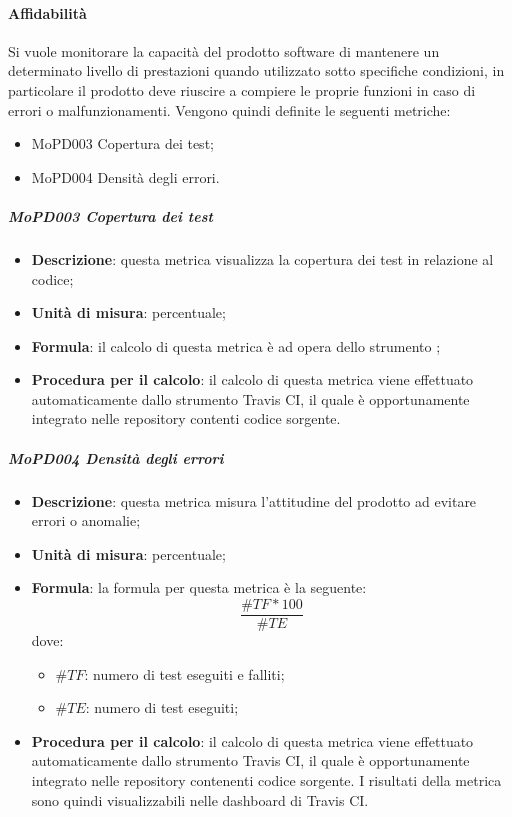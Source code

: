 \documentclass[../norme-di-progetto.tex]{subfiles}
\begin{document}
\paragraph{Affidabilità}
Si vuole monitorare la capacità del prodotto software di mantenere un determinato livello di prestazioni quando utilizzato sotto specifiche condizioni, in particolare il prodotto deve riuscire a compiere le proprie funzioni in caso di errori o malfunzionamenti. Vengono quindi definite le seguenti metriche:
\begin{itemize}
  \item MoPD003 Copertura dei test;
  \item MoPD004 Densità degli errori.
\end{itemize}
\subparagraph{MoPD003 Copertura dei test}
\begin{itemize}
  \item \textbf{Descrizione}: questa metrica visualizza la copertura dei test in relazione al codice;
  \item \textbf{Unità di misura}: percentuale;
  \item \textbf{Formula}: il calcolo di questa metrica è ad opera dello strumento ;
  \item \textbf{Procedura per il calcolo}: il calcolo di questa metrica viene effettuato automaticamente dallo strumento Travis CI, il quale è opportunamente integrato nelle repository contenti codice sorgente.
\end{itemize}

\subparagraph{MoPD004 Densità degli errori}
\begin{itemize}
  \item \textbf{Descrizione}: questa metrica misura l'attitudine del prodotto ad evitare errori o anomalie;
  \item \textbf{Unità di misura}: percentuale;
  \item \textbf{Formula}: la formula per questa metrica è la seguente:
  \begin{displaymath}
    \frac{\#TF * 100}{\#TE}
  \end{displaymath}
  dove:
  \begin{itemize}
    \item $ \#TF $: numero di test eseguiti e falliti;
    \item $ \#TE $: numero di test eseguiti;
  \end{itemize}
  \item \textbf{Procedura per il calcolo}: il calcolo di questa metrica viene effettuato automaticamente dallo strumento Travis CI, il quale è opportunamente integrato nelle repository contenenti codice sorgente. I risultati della metrica sono quindi visualizzabili nelle dashboard di Travis CI.
\end{itemize}
\end{document}
